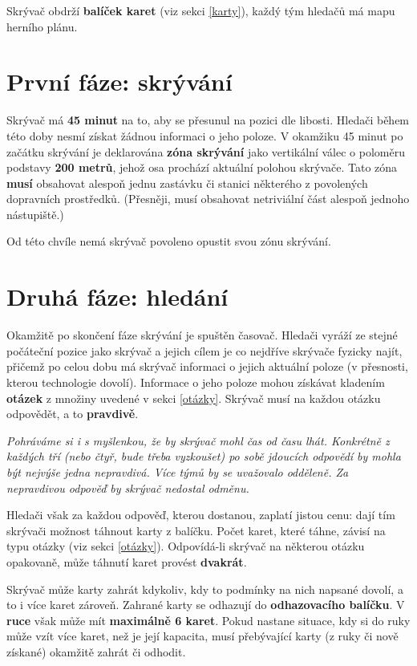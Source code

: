 \documentclass{book}
\newenvironment{reasoning}{\begin{small}\itshape}{\end{small}}
\def\timehiding/{45 minut}
\def\hidingzoneradius/{200 metrů}
\begin{document}
Skrývač obdrží \textbf{balíček karet} (viz sekci \ref{karty}), každý tým hledačů má mapu herního plánu.

\section{První fáze: skrývání}

Skrývač má \textbf{\timehiding/} na to, aby se přesunul na pozici dle libosti. Hledači během této doby nesmí získat žádnou informaci o jeho poloze. V okamžiku \timehiding/ po začátku skrývání je deklarována \textbf{zóna skrývání} jako vertikální válec o poloměru podstavy \textbf{\hidingzoneradius/}, jehož osa prochází aktuální polohou skrývače. Tato zóna \textbf{musí} obsahovat alespoň jednu zastávku či stanici některého z povolených dopravních prostředků. (Přesněji, musí obsahovat netriviální část alespoň jednoho nástupiště.)

Od této chvíle nemá skrývač povoleno opustit svou zónu skrývání.

\section{Druhá fáze: hledání}

Okamžitě po skončení fáze skrývání je spuštěn časovač. Hledači vyráží ze stejné počáteční pozice jako skrývač a jejich cílem je co nejdříve skrývače fyzicky najít, přičemž po celou dobu má skrývač informaci o jejich aktuální poloze (v přesnosti, kterou technologie dovolí). Informace o jeho poloze mohou získávat kladením \textbf{otázek} z množiny uvedené v sekci \ref{otázky}. Skrývač musí na každou otázku odpovědět, a to \textbf{pravdivě}.

\begin{reasoning}
	Pohráváme si i s myšlenkou, že by skrývač mohl čas od času lhát. Konkrétně z každých tří (nebo čtyř, bude třeba vyzkoušet) po sobě jdoucích odpovědí by mohla být nejvýše jedna nepravdivá. Více týmů by se uvažovalo odděleně. Za nepravdivou odpověď by skrývač nedostal odměnu.
\end{reasoning}

Hledači však za každou odpověď, kterou dostanou, zaplatí jistou cenu: dají tím skrývači možnost táhnout karty z balíčku. Počet karet, které táhne, závisí na typu otázky (viz sekci \ref{otázky}). Odpovídá-li skrývač na některou otázku opakovaně, může táhnutí karet provést \textbf{dvakrát}.

Skrývač může karty zahrát kdykoliv, kdy to podmínky na nich napsané dovolí, a to i více karet zároveň. Zahrané karty se odhazují do \textbf{odhazovacího balíčku}. V \textbf{ruce} však může mít \textbf{maximálně 6 karet}. Pokud nastane situace, kdy si do ruky může vzít více karet, než je její kapacita, musí přebývající karty (z ruky či nově získané) okamžitě zahrát či odhodit.
\end{document}
